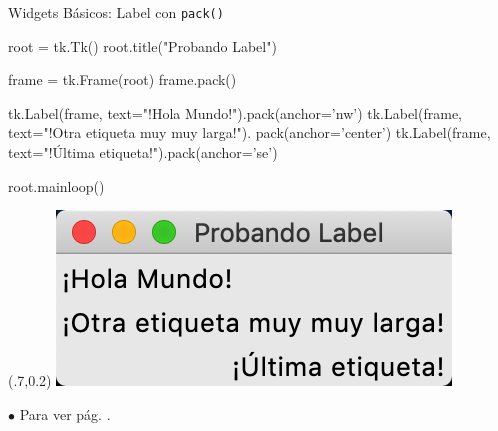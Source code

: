 \documentclass[10pt, envcountsect , spanish]{beamer}
\begin{document}
\begin{frame}[fragile]{Widgets Básicos: Label}
{ con {\tt pack()}}

\begin{pyverbatim}[][frame=single]
root = tk.Tk()
root.title("Probando Label")


frame = tk.Frame(root)
frame.pack()

tk.Label(frame, text="!Hola Mundo!").pack(anchor='nw')
tk.Label(frame, text="!Otra etiqueta muy muy larga!").
                                         pack(anchor='center')
tk.Label(frame, text="!Última etiqueta!").pack(anchor='se')

root.mainloop()
\end{pyverbatim}

\begin{textblock*}{.4\textwidth}(.7\textwidth,0.2\textheight)
\includegraphics[width=\textwidth]{fig/label-con-pack}
\end{textblock*}

{\scriptsize $\bullet$
Para  ver pág. \pageref{pack}.
}
\end{frame}
\end{document}
